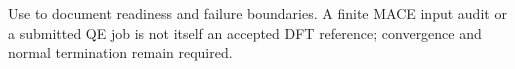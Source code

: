 Use to document readiness and failure boundaries. A finite MACE input audit or a submitted QE job is not itself an accepted DFT reference; convergence and normal termination remain required.
